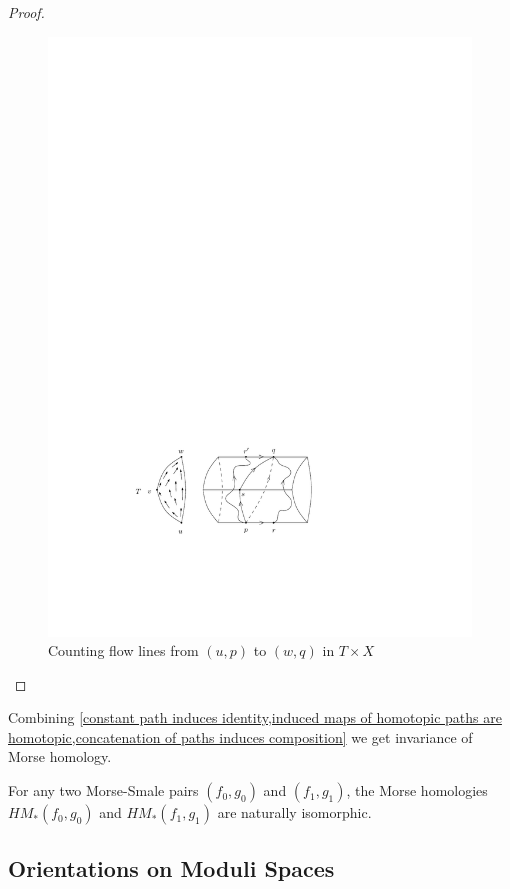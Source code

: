 \begin{proof}
\begin{figure}[tb]
\centering
\includegraphics[scale=1]{graphics/trigon}
\caption{Counting flow lines from $(u,p)$ to $(w,q)$ in $T \times X$}
\label{trigon}
\end{figure}
\end{proof}



Combining \cref{constant path induces identity,induced maps of homotopic paths are homotopic,concatenation of paths induces composition} we get invariance of Morse homology.
\begin{cor}
For any two Morse-Smale pairs $(f_0,g_0)$ and $(f_1,g_1)$, the Morse homologies $HM_*(f_0,g_0)$ and $HM_*(f_1,g_1)$ are naturally isomorphic.
\end{cor}



\subsection{Orientations on Moduli Spaces}
\label{Geometric Orientations and Orientations on Moduli Spaces}


